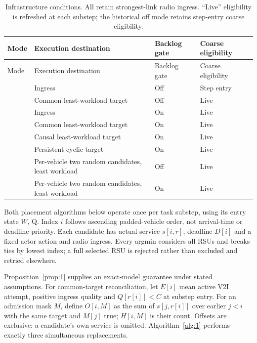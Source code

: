 \documentclass[12pt,a4paper]{article}
\begin{document}
\begingroup
\singlespacing\footnotesize\setlength{\tabcolsep}{3pt}
\renewcommand{\thetable}{3}
\begin{xltabular}{\textwidth}{@{}YYYY@{}}
\caption[Infrastructure conditions]{Infrastructure conditions. All retain strongest-link radio ingress. ``Live'' eligibility is refreshed at each substep; the historical off mode retains step-entry coarse eligibility.}\label{tab:3} \\
\toprule
Mode & Execution destination & Backlog gate & Coarse eligibility \\
\midrule\endfirsthead
\toprule
Mode & Execution destination & Backlog gate & Coarse eligibility \\
\midrule\endhead
\bottomrule\endfoot
{} & Ingress & Off & Step entry \\
 & Common least-workload target & Off & Live \\
 & Ingress & On & Live \\
 & Common least-workload target & On & Live \\
 & Causal least-workload target & On & Live \\
 & Persistent cyclic target & On & Live \\
 & Per-vehicle two random candidates, least workload & Off & Live \\
 & Per-vehicle two random candidates, least workload & On & Live \\
\end{xltabular}
\endgroup

Both placement algorithms below operate once per task substep, using its entry state $W$, Q. Index $i$ follows ascending padded-vehicle order, not arrival-time or deadline priority. Each candidate has actual service $s[i,r]$, deadline $D[i]$ and a fixed actor action and radio ingress. Every argmin considers all RSUs and breaks ties by lowest index; a full selected RSU is rejected rather than excluded and retried elsewhere.

Proposition~\ref{prop:1} supplies an exact-model guarantee under stated assumptions. For common-target reconciliation, let $E[i]$ mean active V2I attempt, positive ingress quality and $Q[r[i]]<C$ at substep entry. For an admission mask $M$, define $O[i,M]$ as the sum of $s[j,r[i]]$ over earlier $j<i$ with the same target and $M[j]$ true; $H[i,M]$ is their count. Offsets are exclusive: a candidate's own service is omitted. Algorithm~\ref{alg:1} performs exactly three simultaneous replacements.
\end{document}
